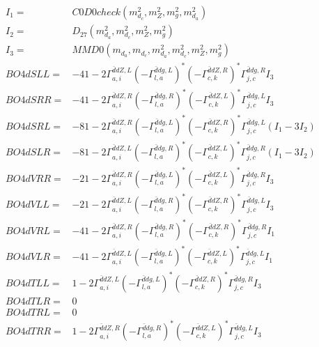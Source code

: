 \documentclass[A4,landscape]{article}
\begin{document}
\begin{align} 
I_1 = & C0D0check(m^2_{d_{{c}}}, m^2_{Z}, m^2_{g}, m^2_{d_{{a}}}) \\ 
I_2 = & D_{27}(m^2_{d_{{a}}}, m^2_{d_{{c}}}, m^2_{Z}, m^2_{g}) \\ 
I_3 = & MMD0(m_{d_{{a}}}, m_{d_{{c}}}, m^2_{d_{{a}}}, m^2_{d_{{c}}}, m^2_{Z}, m^2_{g}) \\ 
  BO4dSLL= & -4 1
-
2 \Gamma^{\bar{d}d Z ,L}_{a, i} (- \Gamma^{\bar{d}d g ,L} _{l, a})^* (- \Gamma^{\bar{d}d Z ,R} _{c, k})^* \Gamma^{\bar{d}d g ,R}_{j, c} I_3 \\ 
  BO4dSRR= & -4 1
-
2 \Gamma^{\bar{d}d Z ,R}_{a, i} (- \Gamma^{\bar{d}d g ,R} _{l, a})^* (- \Gamma^{\bar{d}d Z ,L} _{c, k})^* \Gamma^{\bar{d}d g ,L}_{j, c} I_3 \\ 
  BO4dSRL= & -8 1
-
2 \Gamma^{\bar{d}d Z ,R}_{a, i} (- \Gamma^{\bar{d}d g ,L} _{l, a})^* (- \Gamma^{\bar{d}d Z ,R} _{c, k})^* \Gamma^{\bar{d}d g ,L}_{j, c} (I_1 - 3 I_2) \\ 
  BO4dSLR= & -8 1
-
2 \Gamma^{\bar{d}d Z ,L}_{a, i} (- \Gamma^{\bar{d}d g ,R} _{l, a})^* (- \Gamma^{\bar{d}d Z ,L} _{c, k})^* \Gamma^{\bar{d}d g ,R}_{j, c} (I_1 - 3 I_2) \\ 
  BO4dVRR= & -2 1
-
2 \Gamma^{\bar{d}d Z ,R}_{a, i} (- \Gamma^{\bar{d}d g ,L} _{l, a})^* (- \Gamma^{\bar{d}d Z ,L} _{c, k})^* \Gamma^{\bar{d}d g ,R}_{j, c} I_3 \\ 
  BO4dVLL= & -2 1
-
2 \Gamma^{\bar{d}d Z ,L}_{a, i} (- \Gamma^{\bar{d}d g ,R} _{l, a})^* (- \Gamma^{\bar{d}d Z ,R} _{c, k})^* \Gamma^{\bar{d}d g ,L}_{j, c} I_3 \\ 
  BO4dVRL= & -4 1
-
2 \Gamma^{\bar{d}d Z ,R}_{a, i} (- \Gamma^{\bar{d}d g ,R} _{l, a})^* (- \Gamma^{\bar{d}d Z ,R} _{c, k})^* \Gamma^{\bar{d}d g ,R}_{j, c} I_1 \\ 
  BO4dVLR= & -4 1
-
2 \Gamma^{\bar{d}d Z ,L}_{a, i} (- \Gamma^{\bar{d}d g ,L} _{l, a})^* (- \Gamma^{\bar{d}d Z ,L} _{c, k})^* \Gamma^{\bar{d}d g ,L}_{j, c} I_1 \\ 
  BO4dTLL= & 1
-
2 \Gamma^{\bar{d}d Z ,L}_{a, i} (- \Gamma^{\bar{d}d g ,L} _{l, a})^* (- \Gamma^{\bar{d}d Z ,R} _{c, k})^* \Gamma^{\bar{d}d g ,R}_{j, c} I_3 \\ 
  BO4dTLR= & 0 \\ 
  BO4dTRL= & 0 \\ 
  BO4dTRR= & 1
-
2 \Gamma^{\bar{d}d Z ,R}_{a, i} (- \Gamma^{\bar{d}d g ,R} _{l, a})^* (- \Gamma^{\bar{d}d Z ,L} _{c, k})^* \Gamma^{\bar{d}d g ,L}_{j, c} I_3 \\ 
\end{align} 
\end{document}
